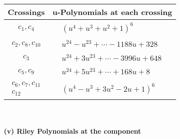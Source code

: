 \documentclass[1p]{elsarticle_modified}
\theoremstyle{definition}
\begin{document}
\begin{tabular}{m{50pt}|m{274pt}}
Crossings & \hspace{64pt}u-Polynomials at each crossing \\
\hline $$\begin{aligned}c_{1},c_{4}\end{aligned}$$&$\begin{aligned}
&(u^4+u^3+u^2+1)^6
\end{aligned}$\\
\hline $$\begin{aligned}c_{2},c_{8},c_{10}\end{aligned}$$&$\begin{aligned}
&u^{24}- u^{23}+\cdots-1188 u+328
\end{aligned}$\\
\hline $$\begin{aligned}c_{3}\end{aligned}$$&$\begin{aligned}
&u^{24}+3 u^{23}+\cdots-3996 u+648
\end{aligned}$\\
\hline $$\begin{aligned}c_{5},c_{9}\end{aligned}$$&$\begin{aligned}
&u^{24}+5 u^{23}+\cdots+168 u+8
\end{aligned}$\\
\hline $$\begin{aligned}c_{6},c_{7},c_{11}\\c_{12}\end{aligned}$$&$\begin{aligned}
&(u^4- u^3+3 u^2-2 u+1)^6
\end{aligned}$\\
\hline
\end{tabular}\\~\\
\newpage\renewcommand{\arraystretch}{1}
\flushleft \textbf{(v) Riley Polynomials at the component}\newline \\
\end{document}
